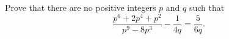 Prove that there are no positive integers $p$ and $q$ such that
\[
\dfrac{p^6+2p^4+p^2}{p^9-8p^3}-\dfrac{1}{4q}=\dfrac{5}{6q}.
\]
